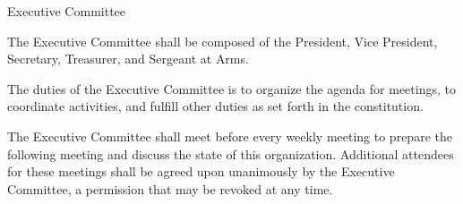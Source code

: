 {
	\begin{article}{Executive Committee}
		\item The Executive Committee shall be composed of the President, Vice President, Secretary, Treasurer, and Sergeant at Arms.
		\item The duties of the Executive Committee is to organize the agenda for meetings, to coordinate activities, and fulfill other duties as set forth in the constitution.
		\item The Executive Committee shall meet before every weekly meeting to prepare the following meeting and discuss the state of this organization.  Additional attendees for these meetings shall be agreed upon unanimously by the Executive Committee, a permission that may be revoked at any time.
	\end{article}
}